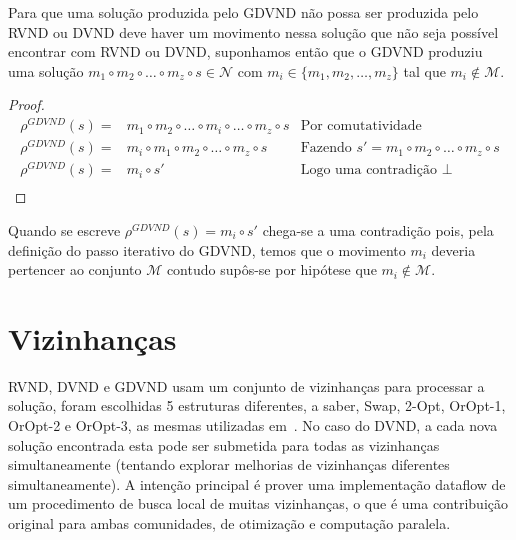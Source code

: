 Para que uma solução produzida pelo GDVND não possa ser produzida pelo RVND ou DVND deve haver um movimento nessa solução que não seja possível encontrar com RVND ou DVND, suponhamos então que o GDVND produziu uma solução $m_1 \circ m_2 \circ \dots \circ m_z \circ s \in \mathcal{N}$ com $m_i \in \{ m_1, m_2, \dots, m_z \}$ tal que $m_i \notin \mathcal{M}$.
\begin{proof}
\begin{align*}
\rho^{GDVND}(s) =& m_1 \circ m_2 \circ \dots \circ m_i \circ \dots \circ m_z \circ s & \textrm{Por comutatividade} \\
\rho^{GDVND}(s) =& m_i \circ m_1 \circ m_2 \circ \dots \circ m_z \circ s & \textrm{Fazendo } s' = m_1 \circ m_2 \circ \dots \circ m_z \circ s \\
\rho^{GDVND}(s) =& m_i \circ s' & \textrm{Logo uma contradição } \bot \\
\end{align*}
\end{proof}
Quando se escreve $\rho^{GDVND}(s) = m_i \circ s'$ chega-se a uma contradição pois, pela definição do passo iterativo do GDVND, temos que o movimento $m_i$ deveria pertencer ao conjunto $\mathcal{M}$ contudo supôs-se por hipótese que $m_i \notin \mathcal{M}$.

\section{Vizinhanças}\label{sec:neighborhoods}

RVND, DVND e GDVND usam um conjunto de vizinhanças para processar a solução, foram escolhidas 5 estruturas diferentes, a saber, Swap, 2-Opt, OrOpt-1, OrOpt-2 e OrOpt-3, as mesmas utilizadas em~\cite{wamca2016}.
No caso do DVND, a cada nova solução encontrada esta pode ser submetida para todas as vizinhanças simultaneamente (tentando explorar melhorias de vizinhanças diferentes simultaneamente).
A intenção principal é prover uma implementação dataflow de um procedimento de busca local de muitas vizinhanças, o que é uma contribuição original para ambas comunidades, de otimização e computação paralela.

